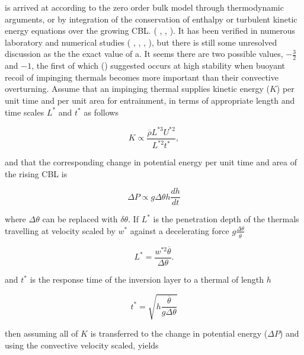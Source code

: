 is arrived at according to the zero order bulk model through thermodynamic arguments, or by integration of the conservation of enthalpy or turbulent kinetic energy equations over the growing \acs{CBL}. (\citeauthor{Tennekes73} \citeyear{Tennekes73}, \citeauthor{Deardorff79} \citeyear{Deardorff79}, \citeauthor{FedConzMir04} \citeyear{FedConzMir04}). It has been verified in numerous laboratory and numerical studies (\citeauthor{DearWill80} \citeyear{DearWill80}, \citeauthor{SullMoengStev} \citeyear{SullMoengStev}, \citeauthor{FedConzMir04} \citeyear{FedConzMir04}, \citeauthor{BrooksFowler2} \citeyear{BrooksFowler2}), but there is still some 
unresolved discussion as the the exact value of a.  It seems there are two possible values, $-\frac{3}{2}$ and $-1$, the first of which \citeauthor{Turner86} (\citeyear{Turner86}) suggested occurs at high stability when buoyant recoil of impinging thermals becomes more important than their convective overturning. Assume that an impinging thermal supplies kinetic energy ($K$) per unit time and per unit area for entrainment, in terms of appropriate length and time scales $L^{*}$ and $t^{*}$ as follows 

\begin{equation}
K \propto \frac{\overline{\rho} L^{*3} U^{*2}}{L^{*2} t^{*}},
\end{equation}

and that the corresponding change in potential energy per unit time and area of the rising \acs{CBL} is

\begin{equation}
\Delta P \propto g \Delta \theta h \frac{d h}{ dt}  
\end{equation}

where $\Delta \theta$ can be replaced with $\delta \theta$.  If $L^{*}$ is the penetration depth of the thermals travelling at velocity scaled by $w^{*}$ against a decelerating force
$g \frac{\Delta \theta}{\overline{\theta}}$

\begin{equation}
L^{*} = \frac{w^{*2} \overline{\theta}}{\Delta \theta}.  
\end{equation}

and $t^{*}$ is the response time of the inversion layer to a thermal of length $h$

\begin{equation}
t^{*} = \sqrt{h \frac{\overline{\theta}}{g \Delta \theta}}  
\end{equation}

then assuming all of $K$ is transferred to the change in potential energy ($\Delta P$) and using the convective velocity scaled, yields

